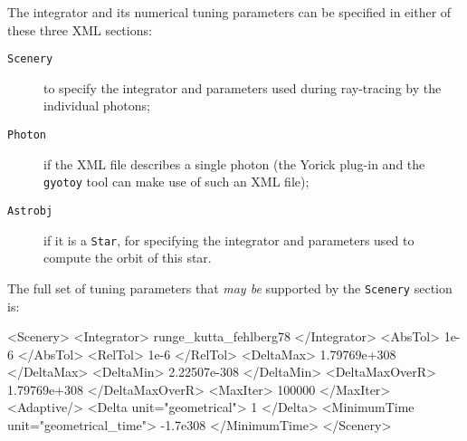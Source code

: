 \documentclass[a4paper,12pt]{article}
\begin{document}
The integrator and its numerical tuning parameters can be specified in
either of these three XML sections:
\begin{description}
\item[\texttt{Scenery}] to specify the integrator and parameters used
  during ray-tracing by the individual photons;
\item[\texttt{Photon}] if the XML file describes a single photon (the
  Yorick plug-in and the \texttt{gyotoy} tool can make use of such an
  XML file);
\item[\texttt{Astrobj}] if it is a \texttt{Star}, for specifying the
  integrator and parameters used to compute the orbit of this star.
\end{description}

The full set of tuning parameters that \emph{may be} supported by the
\texttt{Scenery} section is:
\begin{code}
<Scenery>
  <Integrator> runge_kutta_fehlberg78 </Integrator>
  <AbsTol> 1e-6 </AbsTol>
  <RelTol> 1e-6 </RelTol>
  <DeltaMax> 1.79769e+308 </DeltaMax>
  <DeltaMin> 2.22507e-308 </DeltaMin>
  <DeltaMaxOverR> 1.79769e+308 </DeltaMaxOverR>
  <MaxIter> 100000 </MaxIter>
  <Adaptive/>
  <Delta unit="geometrical"> 1 </Delta>
  <MinimumTime unit="geometrical_time"> -1.7e308 </MinimumTime>
</Scenery>
\end{code}
\end{document}
